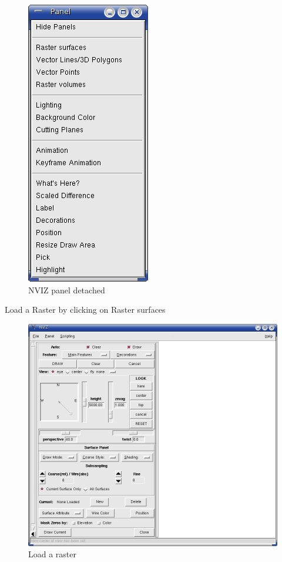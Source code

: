 \begin{figure}[htbp]
   \centering
   \includegraphics[scale=0.35]{nviz002.png}
   \caption{NVIZ panel detached}
   \label{fig:nviz002}
\end{figure}

Load a Raster by clicking on Raster surfaces

\begin{figure}[htbp]
   \centering
   \includegraphics[scale=0.2]{nviz003.png}
   \caption{Load a raster}
   \label{fig:nviz003}
\end{figure}

